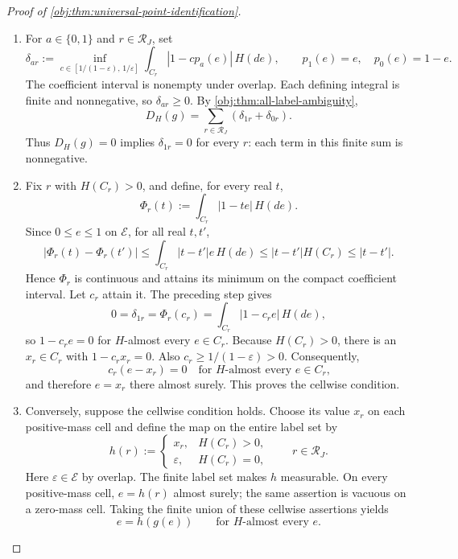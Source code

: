 \begin{proof}[Proof of \cref{obj:thm:universal-point-identification}]
\begin{enumerate}
\item For \(a\in\{0,1\}\) and \(r\in\mathcal R_J\), set
\[
\delta_{ar}:=
\inf_{c\in[1/(1-\varepsilon),\,1/\varepsilon]}
\int_{C_r}|1-cp_a(e)|\,H(de),
\qquad p_1(e)=e,\quad p_0(e)=1-e.
\]
The coefficient interval is nonempty under overlap. Each defining integral is finite and nonnegative, so \(\delta_{ar}\geq0\). By \cref{obj:thm:all-label-ambiguity},
\[
D_H(g)=\sum_{r\in\mathcal R_J}(\delta_{1r}+\delta_{0r}).
\]
Thus \(D_H(g)=0\) implies \(\delta_{1r}=0\) for every \(r\): each term in this finite sum is nonnegative. %

\item Fix \(r\) with \(H(C_r)>0\), and define, for every real \(t\),
\[
\Phi_r(t):=\int_{C_r}|1-te|\,H(de).
\]
Since \(0\leq e\leq1\) on \(\mathcal E\), for all real \(t,t'\),
\[
|\Phi_r(t)-\Phi_r(t')|
\leq \int_{C_r}|t-t'|e\,H(de)
\leq |t-t'|H(C_r)
\leq |t-t'|.
\]
Hence \(\Phi_r\) is continuous and attains its minimum on the compact coefficient interval. Let \(c_r\) attain it. The preceding step gives
\[
0=\delta_{1r}=\Phi_r(c_r)
=\int_{C_r}|1-c_re|\,H(de),
\]
so \(1-c_re=0\) for \(H\)-almost every \(e\in C_r\). Because \(H(C_r)>0\), there is an \(x_r\in C_r\) with \(1-c_rx_r=0\). Also \(c_r\geq1/(1-\varepsilon)>0\). Consequently,
\[
c_r(e-x_r)=0
\quad\text{for \(H\)-almost every \(e\in C_r\),}
\]
and therefore \(e=x_r\) there almost surely. This proves the cellwise condition. %

\item Conversely, suppose the cellwise condition holds. Choose its value \(x_r\) on each positive-mass cell and define the map on the entire label set by
\[
h(r):=
\begin{cases}
x_r,&H(C_r)>0,\\
\varepsilon,&H(C_r)=0,
\end{cases}
\qquad r\in\mathcal R_J.
\]
Here \(\varepsilon\in\mathcal E\) by overlap. The finite label set makes \(h\) measurable. On every positive-mass cell, \(e=h(r)\) almost surely; the same assertion is vacuous on a zero-mass cell. Taking the finite union of these cellwise assertions yields
\[
e=h(g(e))\qquad\text{for \(H\)-almost every \(e\)}.
\]


\end{enumerate}
\end{proof}
